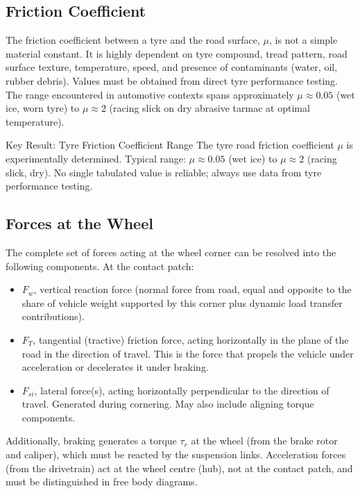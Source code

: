 \documentclass[10pt,a4paper]{article}
\begin{document}
\subsection{Friction Coefficient}

The friction coefficient between a tyre and the road surface, $\mu$, is not a simple material constant. It is highly dependent on tyre compound, tread pattern, road surface texture, temperature, speed, and presence of contaminants (water, oil, rubber debris). Values must be obtained from direct tyre performance testing. The range encountered in automotive contexts spans approximately $\mu \approx 0.05$ (wet ice, worn tyre) to $\mu \approx 2$ (racing slick on dry abrasive tarmac at optimal temperature).

\begin{keybox}{Key Result: Tyre Friction Coefficient Range}
The tyre road friction coefficient $\mu$ is experimentally determined. Typical range: $\mu \approx 0.05$ (wet ice) to $\mu \approx 2$ (racing slick, dry). No single tabulated value is reliable; always use data from tyre performance testing.
\end{keybox}

\subsection{Forces at the Wheel}

The complete set of forces acting at the wheel corner can be resolved into the following components. At the contact patch:
\begin{itemize}
\item $F_w$, vertical reaction force (normal force from road, equal and opposite to the share of vehicle weight supported by this corner plus dynamic load transfer contributions).
\item $F_T$, tangential (tractive) friction force, acting horizontally in the plane of the road in the direction of travel. This is the force that propels the vehicle under acceleration or decelerates it under braking.
\item $F_{si}$, lateral force(s), acting horizontally perpendicular to the direction of travel. Generated during cornering. May also include aligning torque components.
\end{itemize}

Additionally, braking generates a torque $\tau_r$ at the wheel (from the brake rotor and caliper), which must be reacted by the suspension links. Acceleration forces (from the drivetrain) act at the wheel centre (hub), not at the contact patch, and must be distinguished in free body diagrams.
\end{document}
